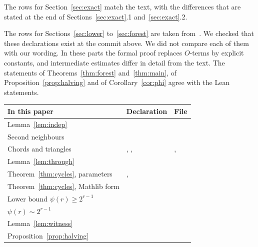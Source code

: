 \documentclass[11pt]{article}
\theoremstyle{definition}
\theoremstyle{remark}
\numberwithin{equation}{section}
\begin{document}
The rows for Section~\ref{sec:exact} match the text, with the differences that are stated at the
end of Sections~\ref{sec:exact}.1 and~\ref{sec:exact}.2.

The rows for Sections~\ref{sec:lower} to~\ref{sec:forest} are taken from~\cite[Appendix~A]{KNT}. We
checked that these declarations exist at the commit above. We did not compare each of them with our
wording. In these parts the formal proof replaces $O$-terms by explicit constants, and intermediate
estimates differ in detail from the text. The statements of Theorems~\ref{thm:forest}
and~\ref{thm:main}, of Proposition~\ref{prop:halving} and of Corollary~\ref{cor:phi} agree with
the Lean statements.

\begin{center}\begin{minipage}{\linewidth}\centering\small
{}\label{tab:steps}
\smallskip
\renewcommand{\arraystretch}{1.0}
\begin{tabular}{@{}L{3.7cm}L{6.3cm}L{5.6cm}@{}}
\toprule
In this paper & Declaration & File \\
\midrule
Lemma~\ref{lem:indep} &  &  \\
Second neighbours &  &  \\
Chords and triangles & , , 
  & ,  \\
Lemma~\ref{lem:through} &  &  \\
Theorem~\ref{thm:cycles}, parameters & ,
   &  \\
Theorem~\ref{thm:cycles}, Mathlib form &  &
   \\
Lower bound $\psi(r)\ge2^{r-1}$ &  &  \\
$\psi(r)\sim2^{r-1}$ &  &  \\
\midrule
Lemma~\ref{lem:witness} &  &  \\
Proposition~\ref{prop:halving} &  &

\end{tabular}
\end{minipage}
\end{center}
\end{document}
